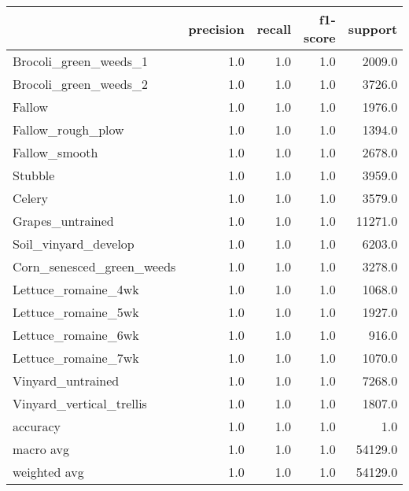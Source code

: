 \begin{tabular}{lrrrr}
\toprule
{} &  precision &  recall &  f1-score &  support \\
\midrule
Brocoli\_green\_weeds\_1     &        1.0 &     1.0 &       1.0 &   2009.0 \\
Brocoli\_green\_weeds\_2     &        1.0 &     1.0 &       1.0 &   3726.0 \\
Fallow                    &        1.0 &     1.0 &       1.0 &   1976.0 \\
Fallow\_rough\_plow         &        1.0 &     1.0 &       1.0 &   1394.0 \\
Fallow\_smooth             &        1.0 &     1.0 &       1.0 &   2678.0 \\
Stubble                   &        1.0 &     1.0 &       1.0 &   3959.0 \\
Celery                    &        1.0 &     1.0 &       1.0 &   3579.0 \\
Grapes\_untrained          &        1.0 &     1.0 &       1.0 &  11271.0 \\
Soil\_vinyard\_develop      &        1.0 &     1.0 &       1.0 &   6203.0 \\
Corn\_senesced\_green\_weeds &        1.0 &     1.0 &       1.0 &   3278.0 \\
Lettuce\_romaine\_4wk       &        1.0 &     1.0 &       1.0 &   1068.0 \\
Lettuce\_romaine\_5wk       &        1.0 &     1.0 &       1.0 &   1927.0 \\
Lettuce\_romaine\_6wk       &        1.0 &     1.0 &       1.0 &    916.0 \\
Lettuce\_romaine\_7wk       &        1.0 &     1.0 &       1.0 &   1070.0 \\
Vinyard\_untrained         &        1.0 &     1.0 &       1.0 &   7268.0 \\
Vinyard\_vertical\_trellis  &        1.0 &     1.0 &       1.0 &   1807.0 \\
accuracy                  &        1.0 &     1.0 &       1.0 &      1.0 \\
macro avg                 &        1.0 &     1.0 &       1.0 &  54129.0 \\
weighted avg              &        1.0 &     1.0 &       1.0 &  54129.0 \\
\bottomrule
\end{tabular}
